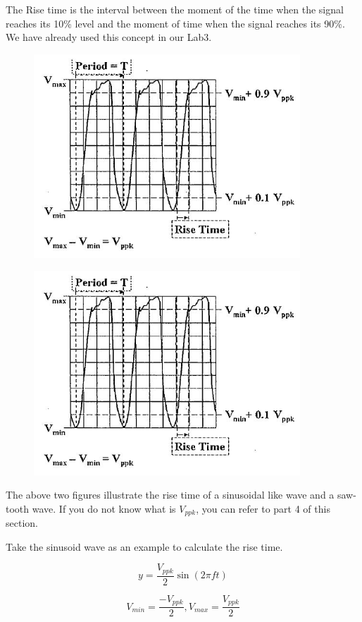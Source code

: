 \documentclass{article}
\begin{document}
The Rise time is the interval between the moment of the time when the signal
reaches its 10\% level and the moment of time when the signal reaches its 90\%.
We have already used this concept in our Lab3.

\begin{figure}[!h]
	\centering
	\includegraphics[width=10cm]{p2.jpg}
	\label{fig-2}
\end{figure}

\begin{figure}[!h]
	\centering
	\includegraphics[width=10cm]{p2.jpg}
	\label{fig-3}
\end{figure}

The above two figures illustrate the rise time of a sinusoidal like wave and a
saw-tooth wave. If you do not know what is $V_{ppk}$, you can refer to part 4 of this
section.

Take the sinusoid wave as an example to calculate the rise time.

$$y=\frac{V_{ppk}}{2}\sin(2\pi ft)$$

$$V_{min}=\frac{-V_{ppk}}{2},V_{max}=\frac{V_{ppk}}{2}$$
\end{document}
